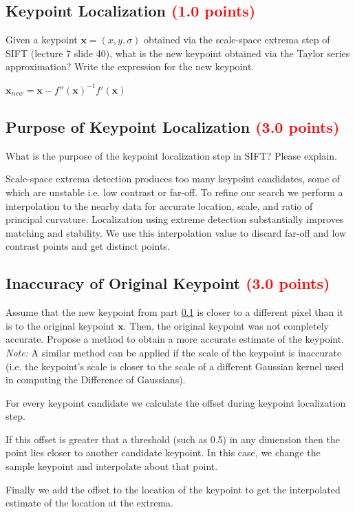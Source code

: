 \documentclass[answers]{exam}
\newcommand{\mypoints}[1]{\textcolor{red}{(#1 points)}}
\begin{document}
\subsection{Keypoint Localization \mypoints{1.0}}
\label{keypoint_loc}
Given a keypoint $\mathbf{x} = (x, y, \sigma)$ obtained via the scale-space extrema step of SIFT (lecture 7 slide 40), what is the new keypoint obtained via the Taylor series approximation? Write the expression for the new keypoint.
\begin{solution}
$\mathbf{x}_{new}= \mathbf{x} - f''(\mathbf{x})^{-1} f'(\mathbf{x})$
\end{solution}

\subsection{Purpose of Keypoint Localization \mypoints{3.0}}
What is the purpose of the keypoint localization step in SIFT? Please explain.
\begin{solution}
Scale-space extrema detection produces too many keypoint candidates, some of which are unstable i.e. low contrast or far-off. To refine our search we perform a interpolation to the nearby data for accurate location, scale, and ratio of principal curvature. Localization using extreme detection substantially improves matching and stability. We use this interpolation value to discard far-off and low contrast points and get distinct points.
\end{solution}

\subsection{Inaccuracy of Original Keypoint \mypoints{3.0}}
Assume that the new keypoint from part \ref{keypoint_loc} is closer to a different pixel than it is to the original keypoint $\mathbf{x}$. Then, the original keypoint was not completely accurate. Propose a method to obtain a more accurate estimate of the keypoint. \emph{Note:} A similar method can be applied if the scale of the keypoint is inaccurate (i.e. the keypoint's scale is closer to the scale of a different Gaussian kernel used in computing the Difference of Gaussians).
\begin{solution}
For every keypoint candidate we calculate the offset during keypoint localization step.

If this offset is greater that a threshold (such as 0.5) in any dimension then the point lies closer to another candidate keypoint. In this case, we change the sample keypoint and interpolate about that point. 

Finally we add the offset to the location of the keypoint to get the interpolated estimate of the location at the extrema.
\end{solution}
\end{document}
